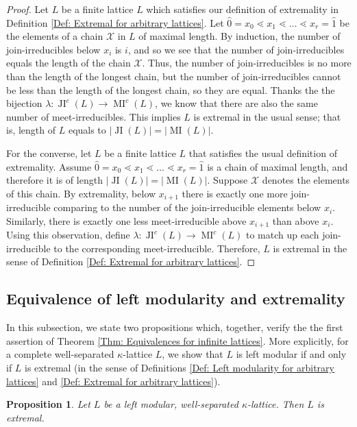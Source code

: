 \documentclass{amsart}
\theoremstyle{thmstyle}
\newtheorem{proposition}[thm]{Proposition}
\theoremstyle{exstyle}
\theoremstyle{defstyle}
\theoremstyle{remstyle}
\theoremstyle{remstyle}
\DeclareMathOperator*{\JI}{JI}
\DeclareMathOperator*{\MI}{MI}
\begin{document}
\begin{proof} Let $L$ be a finite lattice $L$ which satisfies our definition of extremality in Definition \ref{Def: Extremal for arbitrary lattices}. 
Let $\hat 0 =x_0 \lessdot x_1 \lessdot \dots \lessdot x_r=\hat 1$ be the elements of a chain $\mathcal{X}$ in $L$ of maximal length. By induction, the number of join-irreducibles below $x_i$ is $i$, and so we see that the number of join-irreducibles equals the length of the chain $\mathcal{X}$. Thus, the number of join-irreducibles is no more than the length of the longest chain, but the number of join-irreducibles cannot be less than the length of the longest chain, so they are equal. Thanks the the bijection $\lambda: {\JI^c}(L)\to {\MI^c}(L)$, we know that there are also the same number of meet-irreducibles. This implies $L$ is extremal in the usual sense; that is, length of $L$ equals to $|{\JI(L)}|=|{\MI(L)}|$.

For the converse, let $L$ be a finite lattice $L$ that satisfies the usual definition of extremality. Assume $\hat 0 =x_0 \lessdot x_1 \lessdot \dots \lessdot x_r=\hat 1$ is a chain of maximal length, and therefore it is of length $|{\JI(L)}|=|{\MI(L)}|$. Suppose $\mathcal{X}$ denotes the elements of this chain. By extremality, below $x_{i+1}$ there is exactly one more join-irreducible comparing to the number of the join-irreducible elements below $x_i$. Similarly, there is exactly one less meet-irreducible above $x_{i+1}$ than above $x_i$. Using this observation, define $\lambda: {\JI^c}(L)\to {\MI^c}(L)$ to match up each join-irreducible to the corresponding meet-irreducible. Therefore, $L$ is extremal in the sense of Definition \ref{Def: Extremal for arbitrary lattices}.
\end{proof} 

\subsection{Equivalence of left modularity and extremality}\label{Subsection: Equivalence of left modularity and extremality for kappa-lattices}
In this subsection, we state two propositions which, together, verify the the first assertion of Theorem \ref{Thm: Equivalences for infinite lattices}. More explicitly, for a complete well-separated $\kappa$-lattice $L$, we show that $L$ is left modular if and only if $L$ is extremal (in the sense of Definitions \ref{Def: Left modularity for arbitrary lattices} and \ref{Def: Extremal for arbitrary lattices}).

\begin{proposition}\label{Prop:For well-separated kappa-lattices, left modular implies extremal}
Let $L$ be a left modular, well-separated $\kappa$-lattice. Then $L$ is extremal. \end{proposition}
\end{document}
